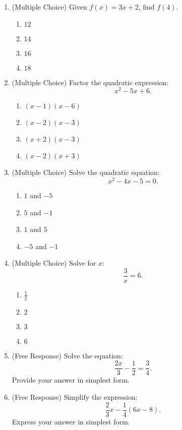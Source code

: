 \documentclass[12pt]{article}
\begin{document}
\begin{enumerate}[label=\textbf{Question \arabic*:}]
  \item (Multiple Choice) Given \( f(x) = 3x + 2 \), find \( f(4) \).
    \begin{enumerate}[label=(\Alph*)]
      \item \(12\)
      \item \(14\)
      \item \(16\)
      \item \(18\)
    \end{enumerate}
    
  \item (Multiple Choice) Factor the quadratic expression:
    \[
    x^2 - 5x + 6.
    \]
    \begin{enumerate}[label=(\Alph*)]
      \item \((x-1)(x-6)\)
      \item \((x-2)(x-3)\)
      \item \((x+2)(x-3)\)
      \item \((x-2)(x+3)\)
    \end{enumerate}
    
  \item (Multiple Choice) Solve the quadratic equation:
    \[
    x^2 - 4x - 5 = 0.
    \]
    \begin{enumerate}[label=(\Alph*)]
      \item \(1\) and \(-5\)
      \item \(5\) and \(-1\)
      \item \(1\) and \(5\)
      \item \(-5\) and \(-1\)
    \end{enumerate}
    
  \item (Multiple Choice) Solve for \( x \):
    \[
    \frac{3}{x} = 6.
    \]
    \begin{enumerate}[label=(\Alph*)]
      \item \(\frac{1}{2}\)
      \item \(2\)
      \item \(3\)
      \item \(6\)
    \end{enumerate}
    
  \item (Free Response) Solve the equation:
    \[
    \frac{2x}{3} - \frac{1}{2} = \frac{3}{4}.
    \]
    Provide your answer in simplest form.
    
  \item (Free Response) Simplify the expression:
    \[
    \frac{2}{3}x - \frac{1}{4}(6x - 8).
    \]
    Express your answer in simplest form.


\end{enumerate}
\end{document}
